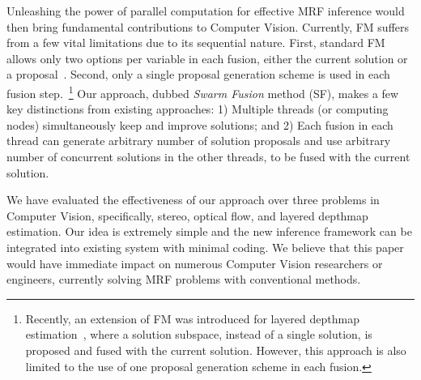 Unleashing the power of parallel computation for effective MRF inference
would then bring fundamental contributions to Computer
Vision. Currently, FM suffers from a few vital limitations due to its
sequential nature. First, standard FM allows only two options per
variable in each fusion, either the current solution or a
proposal~\cite{fusion_moves_for_markov_random_field_optimization}. Second,
only a single proposal generation scheme is used in each fusion
step.~\footnote{Recently, an extension of FM was introduced for layered
depthmap estimation~\cite{layered_depthmap}, where a solution subspace, instead
of a single solution, is proposed and fused with the current
solution. However, this approach is also limited to the use of one proposal
generation scheme in each fusion.}
%
Our approach, dubbed {\it Swarm Fusion} method (SF), makes a few key
distinctions from existing approaches: 1) Multiple threads (or computing
nodes) simultaneously keep and improve solutions; and 2) Each fusion in
each thread can generate arbitrary number of solution proposals and use
arbitrary number of concurrent solutions in the other threads, to be fused
with the current solution.
%


We have evaluated the effectiveness of our approach over three problems
in Computer Vision, specifically, stereo, optical flow, and layered
depthmap estimation.
%
%
%
Our idea is extremely simple and the new inference framework can be
integrated into existing system with minimal coding. We believe that
this paper would have immediate impact on numerous Computer Vision
researchers or engineers, currently solving MRF problems with
conventional methods.



%
%



